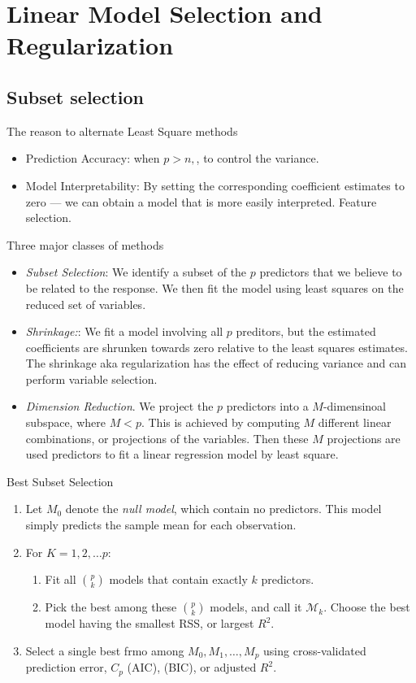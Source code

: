 \documentclass[11pt, a4paper]{article}
\begin{document}
\section{Linear Model Selection and Regularization}
\subsection{Subset selection}
The reason to alternate Least Square methods
\begin{itemize}
\item Prediction Accuracy: when $p>n,$, to control the variance.
\item Model Interpretability: By setting the corresponding coefficient estimates to zero --- we can obtain a model that is more easily interpreted. Feature selection.
\end{itemize}
Three major classes of methods
\begin{itemize}
  \item \emph{Subset Selection}: We identify a subset of the $p$ predictors that we believe to be related to the response. We then fit the model using least squares on the reduced set of variables.
  \item \emph{Shrinkage:}: We fit a model involving all $p$ preditors, but the estimated coefficients are shrunken towards zero relative to the least squares estimates. The shrinkage aka regularization has the effect of reducing variance and can perform variable selection.
  \item \emph{Dimension Reduction}. We project the $p$ predictors into a $M$-dimensinoal subspace, where $M<p$. This is achieved by computing $M$ different linear combinations, or projections of the variables. Then these $M$ projections are used predictors to fit a linear regression model by least square. 
\end{itemize}
Best Subset Selection
\begin{enumerate}
\item Let $M_0$ denote the \emph{null model}, which contain no predictors. This model simply predicts the sample mean for each observation.
\item For $K=1,2,\dots p$:
\begin{enumerate}
\item Fit all $p \choose k$ models that contain exactly $k$ predictors.
\item Pick the best among these $p \choose k$ models, and call it $\mathcal{M}_k$. Choose the best model having the smallest RSS, or largest $R^2$.
\end{enumerate}
\item Select a single best frmo among $M_0,M_1,\dots,M_p$ using cross-validated prediction error, $C_p$ (AIC), (BIC), or adjusted $R^2$.
\end{enumerate}
\end{document}
